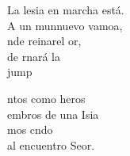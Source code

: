 \begin{cancion}
	La lesia en marcha está.\\
	A un munnuevo vamoa,\\
	nde reinarel or,\\
	de rnará la\\jump\\
	\begin{chorus}%
	ntos como heros\\
	embros de una Isia\\
	mos cndo\\
	al encuentro  Seor.\\
	\end{chorus}%
	\jump\\
\end{cancion}%
